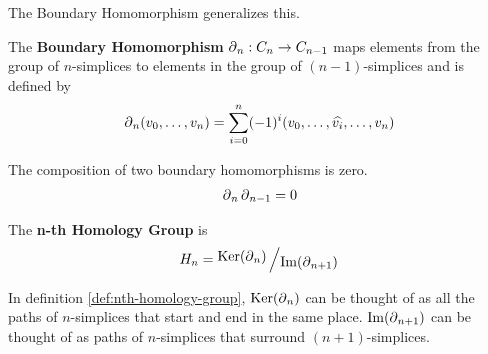 The Boundary Homomorphism generalizes this.

\begin{definition}
    The \textbf{Boundary Homomorphism} \(\operatorname{\partial}_n : C_n \to C_{n-1}\) maps elements from the group of \(n\)-simplices to elements in the group of \((n-1)\)-simplices and is defined by
    \[
        \operatorname{\partial}_n (v_0,\dots , v_{n}) = \sum_{i=0}^n (-1)^{i}
        (v_0,\dots, \widehat{v_i}, \dots, v_n)
    \]
    \cite{hatcher}
\end{definition}

\begin{theorem}\label{thm:homology-composition}
    The composition of two boundary homomorphisms is zero.
    \begin{align*}
		\operatorname{\partial}_n \operatorname{\partial}_{n-1} = 0
	\end{align*}
\end{theorem}

\begin{definition}\label{def:nth-homology-group}
    The \textbf{n-th Homology Group} is \[H_n = \bigslant{\Ker(\boundary_n)}{\Ima(\boundary_{n+1})}\]
    \cite{fraleigha}
\end{definition}

In definition \ref{def:nth-homology-group}, \(\operatorname{Ker}(\operatorname{\partial}_n)\) can be thought of as all the paths of \(n\)-simplices that start and end in the same place.
\(\operatorname{Im}(\operatorname{\partial}_{n+1})\) can be thought of as paths of \(n\)-simplices that surround \((n+1)\)-simplices.

\begin{figure}
    \scalebox{.8}{
        
    }
    \caption{}
    \label{fig:homology-groups}
\end{figure}

